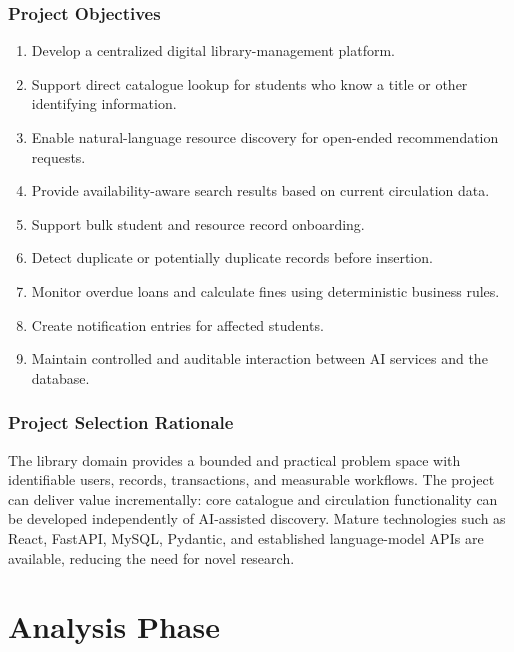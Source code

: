 \documentclass[12pt,a4paper]{report}
\begin{document}
\subsection{Project Objectives}
\begin{enumerate}
\item Develop a centralized digital library-management platform.
\item Support direct catalogue lookup for students who know a title or other identifying information.
\item Enable natural-language resource discovery for open-ended recommendation requests.
\item Provide availability-aware search results based on current circulation data.
\item Support bulk student and resource record onboarding.
\item Detect duplicate or potentially duplicate records before insertion.
\item Monitor overdue loans and calculate fines using deterministic business rules.
\item Create notification entries for affected students.
\item Maintain controlled and auditable interaction between AI services and the database.
\end{enumerate}

\subsection{Project Selection Rationale}
The library domain provides a bounded and practical problem space with identifiable users, records, transactions, and measurable workflows. The project can deliver value incrementally: core catalogue and circulation functionality can be developed independently of AI-assisted discovery. Mature technologies such as React, FastAPI, MySQL, Pydantic, and established language-model APIs are available, reducing the need for novel research.

\chapter{Analysis Phase}
\end{document}
